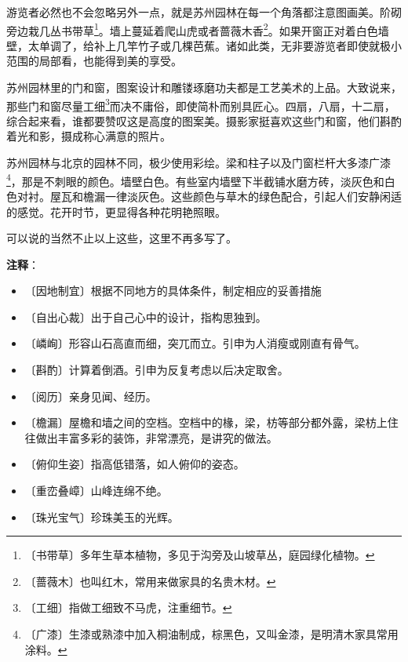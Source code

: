 \documentclass[12pt,UTF-8,openany]{ctexbook}
\begin{document}
\begin{large}
    游览者必然也不会忽略另外一点，就是苏州园林在每一个角落都注意图画美。阶砌旁边栽几丛书带草\footnote{〔书带草〕多年生草本植物，多见于沟旁及山坡草丛，庭园绿化植物。}。墙上蔓延着爬山虎或者蔷薇木香\footnote{〔蔷薇木〕也叫红木，常用来做家具的名贵木材。}。如果开窗正对着白色墙壁，太单调了，给补上几竿竹子或几棵芭蕉。诸如此类，无非要游览者即使就极小范围的局部看，也能得到美的享受。
    
    苏州园林里的门和窗，图案设计和雕镂琢磨功夫都是工艺美术的上品。大致说来，那些门和窗尽量工细\footnote{〔工细〕指做工细致不马虎，注重细节。}而决不庸俗，即使简朴而别具匠心。四扇，八扇，十二扇，综合起来看，谁都要赞叹这是高度的图案美。摄影家挺喜欢这些门和窗，他们斟酌着光和影，摄成称心满意的照片。
    
    苏州园林与北京的园林不同，极少使用彩绘。梁和柱子以及门窗栏杆大多漆广漆\footnote{〔广漆〕生漆或熟漆中加入桐油制成，棕黑色，又叫金漆，是明清木家具常用涂料。}，那是不刺眼的颜色。墙壁白色。有些室内墙壁下半截铺水磨方砖，淡灰色和白色对衬。屋瓦和檐漏一律淡灰色。这些颜色与草木的绿色配合，引起人们安静闲适的感觉。花开时节，更显得各种花明艳照眼。
    
    可以说的当然不止以上这些，这里不再多写了。
    
\end{large}


\newpage

\textbf{注释}：

\vspace{-1em}

\begin{itemize}
    \setlength\itemsep{-0.2em}
    \item 〔因地制宜〕根据不同地方的具体条件，制定相应的妥善措施
    \item 〔自出心裁〕出于自己心中的设计，指构思独到。
    \item 〔嶙峋〕形容山石高直而细，突兀而立。引申为人消瘦或刚直有骨气。
    \item 〔斟酌〕计算着倒酒。引申为反复考虑以后决定取舍。
    \item 〔阅历〕亲身见闻、经历。
    \item 〔檐漏〕屋檐和墙之间的空档。空档中的椽，梁，枋等部分都外露，梁枋上住往做出丰富多彩的装饰，非常漂亮，是讲究的做法。
    \item 〔俯仰生姿〕指高低错落，如人俯仰的姿态。
    \item 〔重峦叠嶂〕山峰连绵不绝。
    \item 〔珠光宝气〕珍珠美玉的光辉。
\end{itemize}
\end{document}
